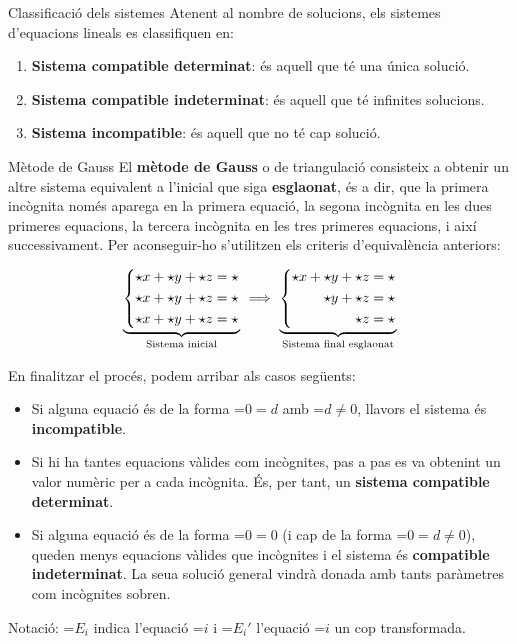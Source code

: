 \documentclass[11pt,a4paper]{article}
\newcommand{\fmm}[1]{\setbox0=\hbox{$#1$}\ifdim\wd0>\linewidth\fmdisp{#1}\else\mbox{\box0}\fi}
\newcommand{\fmdisp}[1]{\[\setbox2=\hbox{$\displaystyle #1$}\ifdim\wd2>\linewidth\resizebox{\linewidth}{!}{\box2}\else\box2\fi\]}
\newcommand{\fmbadge}[2]{\tcbox[on line,colback=#1,colframe=#1,arc=2mm,boxsep=0pt,left=4pt,right=4pt,top=1.5pt,bottom=1.5pt]{\color{white}\footnotesize\bfseries #2}}
\begin{document}
\begin{fmprop}{Classificació dels sistemes}
Atenent al nombre de solucions, els sistemes d'equacions lineals es classifiquen en:

\begin{enumerate}
\item \fmbadge{fmok}{SCD} \textbf{Sistema compatible determinat}: és aquell que té una única solució.
\item \fmbadge{fmev}{SCI} \textbf{Sistema compatible indeterminat}: és aquell que té infinites solucions.
\item \fmbadge{fmsi}{SI} \textbf{Sistema incompatible}: és aquell que no té cap solució.
\end{enumerate}
\end{fmprop}

\begin{fmdef}{Mètode de Gauss}
El \textbf{mètode de Gauss} o de triangulació consisteix a obtenir un altre sistema equivalent a l'inicial que siga \textbf{esglaonat}, és a dir, que la primera incògnita només aparega en la primera equació, la segona incògnita en les dues primeres equacions, la tercera incògnita en les tres primeres equacions, i així successivament. Per aconseguir-ho s'utilitzen els criteris d'equivalència anteriors:

\fmdisp{\underbrace{\left\{\begin{aligned}\star x+\star y+\star z&=\star\\ \star x+\star y+\star z&=\star\\ \star x+\star y+\star z&=\star\end{aligned}\right.}_{\text{Sistema inicial}}\ \Longrightarrow\ \underbrace{\left\{\begin{aligned}\star x+\star y+\star z&=\star\\ \star y+\star z&=\star\\ \star z&=\star\end{aligned}\right.}_{\text{Sistema final esglaonat}}}

En finalitzar el procés, podem arribar als casos següents:

\begin{itemize}
\item Si alguna equació és de la forma \fmm{0=d} amb \fmm{d\neq0}, llavors el sistema és \textbf{incompatible}.
\item Si hi ha tantes equacions vàlides com incògnites, pas a pas es va obtenint un valor numèric per a cada incògnita. És, per tant, un \textbf{sistema compatible determinat}.
\item Si alguna equació és de la forma \fmm{0=0} (i cap de la forma \fmm{0=d\neq0}), queden menys equacions vàlides que incògnites i el sistema és \textbf{compatible indeterminat}. La seua solució general vindrà donada amb tants paràmetres com incògnites sobren.
\end{itemize}

\begin{fmnote}Notació: \fmm{E_i} indica l'equació \fmm{i} i \fmm{E_i'} l'equació \fmm{i} un cop transformada.\end{fmnote}
\end{fmdef}
\end{document}
